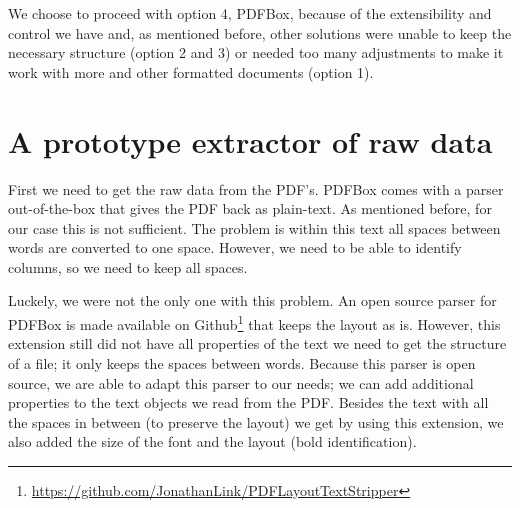 \documentclass{ou-report}
\begin{document}

We choose to proceed with option 4, PDFBox, because of the extensibility and
control we have
and, as mentioned before, other solutions were unable to keep the necessary
structure (option 2 and 3) or needed too many adjustments to make it work with
more and other formatted documents (option 1).
\section{A prototype extractor of raw data}
First we need to get the raw data from the PDF's. PDFBox comes with a parser 
out-of-the-box that gives the PDF back as plain-text. As mentioned  before, for
our case this is not sufficient. The problem is within this text all spaces
between words are converted to one space. However, we need to be able to 
identify columns, so we need to keep all spaces.

Luckely, we were not the only one with this problem. 
An open source parser for PDFBox is made available on
Github\footnote{\url{https://github.com/JonathanLink/PDFLayoutTextStripper}} 
that keeps the layout as is. However, this extension still did not have all
properties of the text we need to get the structure of a file; it only keeps the
spaces between words. 
Because this parser is open source, we are able to adapt this parser to our 
needs; we can add additional properties to the text objects we read from the 
PDF. Besides the text with all the spaces in between (to preserve the layout) we
get by using this extension, we also added the size of the font and the layout
(bold identification).
\end{document}
